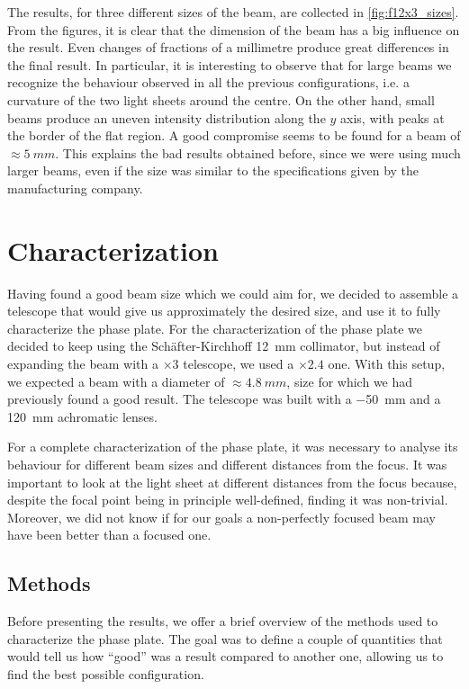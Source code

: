 The results, for three different sizes of the beam, are collected in \cref{fig:f12x3_sizes}. From the figures, it is clear that the dimension of the beam has a big influence on the result. Even changes of fractions of a millimetre produce great differences in the final result. In particular, it is interesting to observe that for large beams we recognize the behaviour observed in all the previous configurations, i.e. a curvature of the two light sheets around the centre. On the other hand, small beams produce an uneven intensity distribution along the $y$ axis, with peaks at the border of the flat region. A good compromise seems to be found for a beam of $\approx \SI{5}{mm}$. This explains the bad results obtained before, since we were using much larger beams, even if the size was similar to the specifications given by the manufacturing company.

\section{Characterization}
\label{sec:characterization}
Having found a good beam size which we could aim for, we decided to assemble a telescope that would give us approximately the desired size, and use it to fully characterize the phase plate. For the characterization of the phase plate we decided to keep using the Schäfter-Kirchhoff \SI{12}{mm} collimator, but instead of expanding the beam with a $\times3$ telescope, we used a $\times2.4$ one. With this setup, we expected a beam with a diameter of $\approx \SI{4.8}{mm}$, size for which we had previously found a good result. The telescope was built with a \SI{-50}{mm} and a \SI{120}{mm} achromatic lenses.

For a complete characterization of the phase plate, it was necessary to analyse its behaviour for different beam sizes and different distances from the focus. It was important to look at the light sheet at different distances from the focus because, despite the focal point being in principle well-defined, finding it was non-trivial. Moreover, we did not know if for our goals a non-perfectly focused beam may have been better than a focused one.

\subsection{Methods}
\label{sec:characterization_methods}
Before presenting the results, we offer a brief overview of the methods used to characterize the phase plate. The goal was to define a couple of quantities that would tell us how \enquote{good} was a result compared to another one, allowing us to find the best possible configuration.


